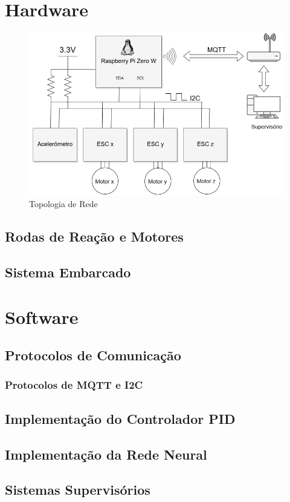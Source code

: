 \section{Hardware}

\begin{figure}[!ht]
  \caption{Topologia de Rede}
  \begin{center}
      \includegraphics[scale=.75]{img/comunicacao_projeto}
  \end{center}
  \label{fig:pid_neural_Applying_p18}
\end{figure}

\subsection{Rodas de Reação e Motores}

\subsection{Sistema Embarcado}

\section{Software}

\subsection{Protocolos de Comunicação}
\subsubsection{Protocolos de MQTT e I2C}

\subsection{Implementação do Controlador PID}

\subsection{Implementação da Rede Neural}

\subsection{Sistemas Supervisórios}
